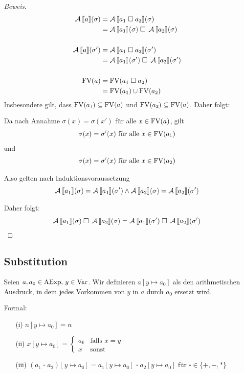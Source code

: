 \begin{proof}[Beweis]
    \begin{align*}
        \A\lsem a \rsem(\sigma) & = \A\lsem a_1 \;\square\; a_2 \rsem(\sigma) \\
        & = \A\lsem a_1 \rsem(\sigma) \;\square\; \A\lsem a_2 \rsem(\sigma) \\
        \\
        \A\lsem a \rsem(\sigma') & = \A\lsem a_1 \;\square\; a_2 \rsem(\sigma') \\
        & = \A\lsem a_1 \rsem(\sigma') \;\square\; \A\lsem a_2 \rsem(\sigma') \\
        \\
        \FV(a) & = \FV(a_1 \;\square\; a_2) \\
        & = \FV(a_1) \cup \FV(a_2)
    \end{align*}
    Insbesondere gilt, dass $\operatorname{FV}(a_1) \subseteq \operatorname{FV}(a)$ und $\operatorname{FV}(a_2) \subseteq \operatorname{FV}(a)$. Daher folgt:

    Da nach Annahme $\sigma(x) = \sigma(x')$ für alle $x \in \operatorname{FV}(a)$, gilt
    \[
    \sigma(x) = \sigma'(x) \text{ für alle } x \in \FV(a_1)$$
    \]
    und
    \[
    \sigma(x) = \sigma'(x) \text{ für alle } x \in \operatorname{FV}(a_2)
    \]

    Also gelten nach Induktionsvoraussetzung
    \[
    \operatorname{\mathcal{A}}\mathrm{[}\kern-.14em\mathrm{[} a_1 \mathrm{]}\kern-.14em\mathrm{]}(\sigma) = \operatorname{\mathcal{A}}\mathrm{[}\kern-.14em\mathrm{[} a_1 \mathrm{]}\kern-.14em\mathrm{]}(\sigma') \wedge \operatorname{\mathcal{A}}\mathrm{[}\kern-.14em\mathrm{[} a_2 \mathrm{]}\kern-.14em\mathrm{]}(\sigma) = \operatorname{\mathcal{A}}\mathrm{[}\kern-.14em\mathrm{[} a_2 \mathrm{]}\kern-.14em\mathrm{]}(\sigma')
    \]

    Daher folgt:
    \[
    \operatorname{\mathcal{A}}\mathrm{[}\kern-.14em\mathrm{[} a_1 \mathrm{]}\kern-.14em\mathrm{]}(\sigma) \;\square\; \operatorname{\mathcal{A}}\mathrm{[}\kern-.14em\mathrm{[} a_2 \mathrm{]}\kern-.14em\mathrm{]}(\sigma) = \operatorname{\mathcal{A}}\mathrm{[}\kern-.14em\mathrm{[} a_1 \mathrm{]}\kern-.14em\mathrm{]}(\sigma') \;\square\; \operatorname{\mathcal{A}}\mathrm{[}\kern-.14em\mathrm{[} a_2 \mathrm{]}\kern-.14em\mathrm{]}(\sigma')
    \]
\end{proof}



\subsection{Substitution}\label{section:substitution}

\begin{definition} \label{def:substitutionExp}
    Seien $a, a_0 \in \operatorname{AExp}, \, y \in \operatorname{Var}$. Wir definieren $a[y \mapsto a_0]$ als den arithmetischen Ausdruck, in dem jedes Vorkommen von $y$ in $a$ durch $a_0$ ersetzt wird.

    Formal:
    \begin{enumerate}
        \item[(i)] $n[y \mapsto a_0] = n$
        \item[(ii)] $x[y \mapsto a_0] = \begin{cases} a_0 & \text{falls } x = y \\ x & \text{sonst} \end{cases}$
        \item[(iii)] $(a_1 \;\square\; a_2)[y \mapsto a_0] = a_1[y \mapsto a_0] \;\square\; a_2[y \mapsto a_0]$ \quad\quad für $\square \in \{ +, -, * \}$
    \end{enumerate}
\end{definition}

